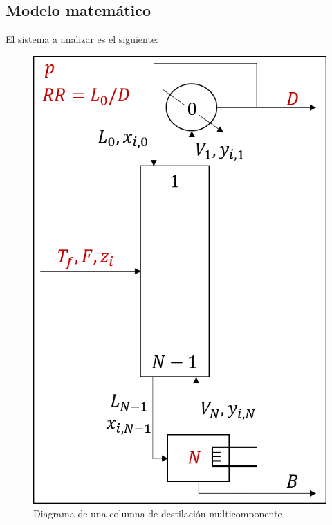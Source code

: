 \subsection{Modelo matemático}
El sistema a analizar es el siguiente:
\begin{figure}[ht]
    \centering
    \includegraphics[width=0.7\linewidth]{../resources/flowcharts/diagrama_columna.png}
    \caption{Diagrama de una columna de destilación multicomponente}
\end{figure}

\newpage
